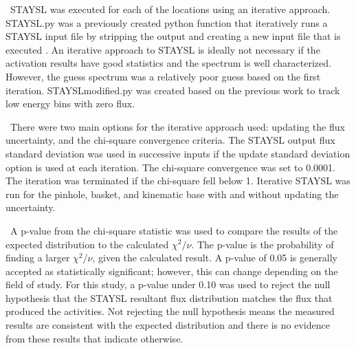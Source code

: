 \documentclass[journal]{IEEEtran}
\begin{document}
	\ STAYSL was executed for each of the locations using an iterative approach. STAYSL.py was a previously created python function that iteratively runs a STAYSL input file by stripping the output and creating a new input file that is executed \cite{Iter}. An iterative approach to STAYSL is ideally not necessary if the activation results have good statistics and the spectrum is well characterized. However, the guess spectrum was a relatively poor guess based on the first iteration. STAYSLmodified.py was created based on the previous work to track low energy bins with zero flux. 
	
	\ There were two main options for the iterative approach used: updating the flux uncertainty, and the chi-square convergence criteria. The STAYSL output flux standard deviation was used in successive inputs if the update standard deviation option is used at each iteration. The chi-square convergence was set to 0.0001. The iteration was terminated if the chi-square fell below 1. Iterative STAYSL was run for the pinhole, basket, and kinematic base with and without updating the uncertainty. 
	
	\ A p-value from the chi-square statistic was used to compare the results of the expected distribution to the calculated $\chi^{2}/\nu$. 
	The p-value is the probability of finding a larger $\chi^{2}/\nu$, given the calculated result. 
	A p-value of 0.05 is generally accepted as statistically significant; however, this can change depending on the field of study. For this study, a p-value under 0.10 was used to reject the null hypothesis that the STAYSL resultant flux distribution matches the flux that produced the activities. Not rejecting the null hypothesis means the measured results are consistent with the expected distribution and there is no evidence from these results that indicate otherwise. 
\end{document}
